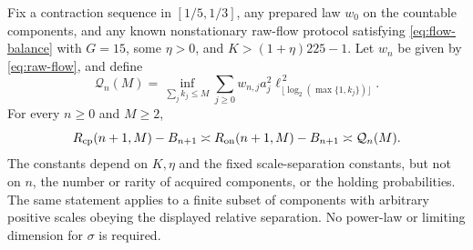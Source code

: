 \begin{theorem}\label{thm:moran}
Fix a contraction sequence in $[1/5,1/3]$, any prepared law $w_0$ on the countable components, and any known nonstationary raw-flow protocol satisfying \eqref{eq:flow-balance} with $G=15$, some $\eta>0$, and $K>(1+\eta)225-1$. Let $w_n$ be given by \eqref{eq:raw-flow}, and define
\begin{equation}\label{eq:moran-Q}
 \mathcal Q_n(M)=\inf_{\sum_jk_j\le M}
       \sum_{j\ge0}w_{n,j}a_j^2
       \ell_{\lfloor\log_2(\max\{1,k_j\})\rfloor}^{\,2}.
\end{equation}
For every $n\ge0$ and $M\ge2$,
\begin{equation}\label{eq:moran-risk}
 R_{\mathrm{cp}}(n+1,M)-B_{n+1}\asymp
 R_{\mathrm{on}}(n+1,M)-B_{n+1}\asymp\mathcal Q_n(M).
\end{equation}
The constants depend on $K,\eta$ and the fixed scale-separation constants, but not on $n$, the number or rarity of acquired components, or the holding probabilities. The same statement applies to a finite subset of components with arbitrary positive scales obeying the displayed relative separation. No power-law or limiting dimension for $\sigma$ is required.
\end{theorem}
